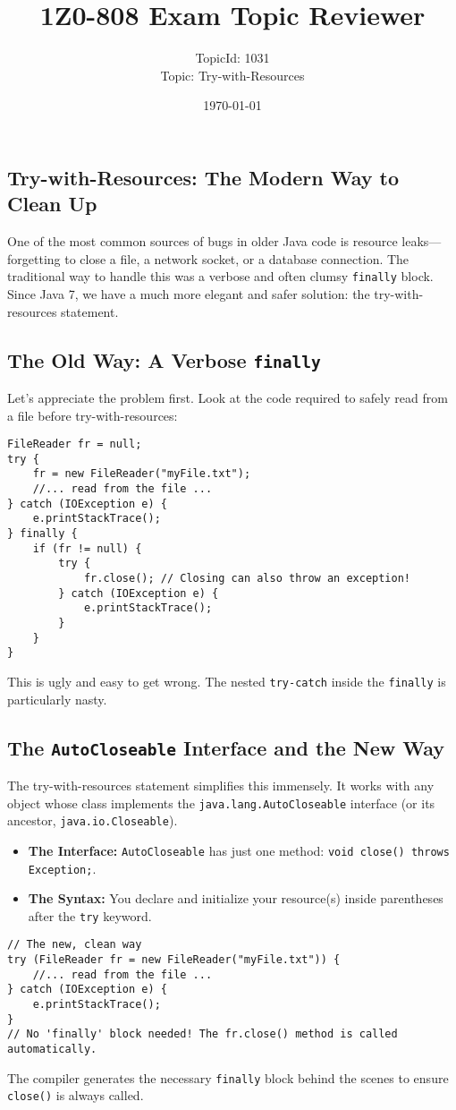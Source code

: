 \documentclass[12pt]{article}
\title{\textbf{1Z0-808 Exam Topic Reviewer}}
\author{TopicId: 1031 \\ Topic: Try-with-Resources}
\date{\today}
\begin{document}
\maketitle
\newpage\begin{enumerate}[label=(\arabic*)]
\section*{Try-with-Resources: The Modern Way to Clean Up}
One of the most common sources of bugs in older Java code is resource leaks—forgetting to close a file, a network socket, or a database connection. The traditional way to handle this was a verbose and often clumsy \texttt{finally} block. Since Java 7, we have a much more elegant and safer solution: the try-with-resources statement.

\subsection{The Old Way: A Verbose \texttt{finally}}
Let's appreciate the problem first. Look at the code required to safely read from a file before try-with-resources:
\begin{verbatim}
FileReader fr = null;
try {
    fr = new FileReader("myFile.txt");
    //... read from the file ...
} catch (IOException e) {
    e.printStackTrace();
} finally {
    if (fr != null) {
        try {
            fr.close(); // Closing can also throw an exception!
        } catch (IOException e) {
            e.printStackTrace();
        }
    }
}
\end{verbatim}
This is ugly and easy to get wrong. The nested \texttt{try-catch} inside the \texttt{finally} is particularly nasty.

\subsection{The \texttt{AutoCloseable} Interface and the New Way}
The try-with-resources statement simplifies this immensely. It works with any object whose class implements the \texttt{java.lang.AutoCloseable} interface (or its ancestor, \texttt{java.io.Closeable}).
\begin{itemize}
    \item \textbf{The Interface:} \texttt{AutoCloseable} has just one method: \texttt{void close() throws Exception;}.
    \item \textbf{The Syntax:} You declare and initialize your resource(s) inside parentheses after the \texttt{try} keyword.
\end{itemize}
\begin{verbatim}
// The new, clean way
try (FileReader fr = new FileReader("myFile.txt")) {
    //... read from the file ...
} catch (IOException e) {
    e.printStackTrace();
}
// No 'finally' block needed! The fr.close() method is called automatically.
\end{verbatim}
The compiler generates the necessary \texttt{finally} block behind the scenes to ensure \texttt{close()} is always called.


\end{enumerate}
\end{document}
